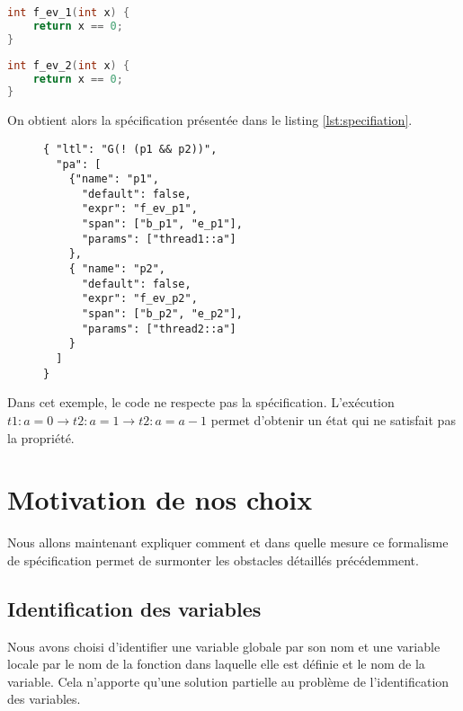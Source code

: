 \noindent\begin{minipage}{.45\textwidth}
\begin{lstlisting}[language=C, frame=single, caption=Proposition atomique p1]
int f_ev_1(int x) {
    return x == 0;
}
\end{lstlisting}
\end{minipage}\hfill
\begin{minipage}{.45\textwidth}
\begin{lstlisting}[language=C, frame=single, caption=Proposition atomique p2]
int f_ev_2(int x) {
    return x == 0;
}
\end{lstlisting}
\end{minipage}

On obtient alors la spécification présentée dans le listing
\ref{lst:specifiation}.

\begin{figure}[ht]
\begin{lstlisting}[frame=single, caption=Spécification, label=lst:specifiation]
{ "ltl": "G(! (p1 && p2))",
  "pa": [
    {"name": "p1",
      "default": false,
      "expr": "f_ev_p1",
      "span": ["b_p1", "e_p1"],
      "params": ["thread1::a"]
    },
    { "name": "p2",
      "default": false,
      "expr": "f_ev_p2",
      "span": ["b_p2", "e_p2"],
      "params": ["thread2::a"]
    }
  ]
}
\end{lstlisting}
\end{figure}

Dans cet exemple, le code ne respecte pas la spécification. L'exécution
\(t1: a = 0 \rightarrow t2: a = 1 \rightarrow t2: a = a - 1\) permet
d'obtenir un état qui ne satisfait pas la propriété.

\section{Motivation de nos choix}

Nous allons maintenant expliquer comment et dans quelle mesure ce formalisme
de spécification permet de surmonter les obstacles détaillés précédemment.

\subsection{Identification des variables}

Nous avons choisi d'identifier une variable globale par son nom et une
variable locale par le nom de la fonction dans laquelle elle est définie
et le nom de la variable. Cela n'apporte qu'une solution partielle au problème
de l'identification des variables.

